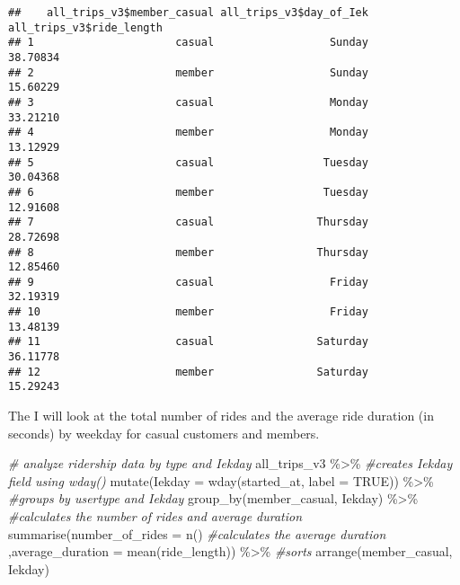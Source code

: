 \documentclass[
]{article}
\newenvironment{Shaded}{\begin{snugshade}}{\end{snugshade}}
\newcommand{\AttributeTok}[1]{\textcolor[rgb]{0.77,0.63,0.00}{#1}}
\newcommand{\CommentTok}[1]{\textcolor[rgb]{0.56,0.35,0.01}{\textit{#1}}}
\newcommand{\ConstantTok}[1]{\textcolor[rgb]{0.00,0.00,0.00}{#1}}
\newcommand{\FunctionTok}[1]{\textcolor[rgb]{0.00,0.00,0.00}{#1}}
\newcommand{\NormalTok}[1]{#1}
\newcommand{\SpecialCharTok}[1]{\textcolor[rgb]{0.00,0.00,0.00}{#1}}
\begin{document}
\begin{Shaded}
\end{Shaded}

\begin{verbatim}
##    all_trips_v3$member_casual all_trips_v3$day_of_Iek all_trips_v3$ride_length
## 1                      casual                  Sunday                 38.70834
## 2                      member                  Sunday                 15.60229
## 3                      casual                  Monday                 33.21210
## 4                      member                  Monday                 13.12929
## 5                      casual                 Tuesday                 30.04368
## 6                      member                 Tuesday                 12.91608
## 7                      casual                Thursday                 28.72698
## 8                      member                Thursday                 12.85460
## 9                      casual                  Friday                 32.19319
## 10                     member                  Friday                 13.48139
## 11                     casual                Saturday                 36.11778
## 12                     member                Saturday                 15.29243
\end{verbatim}

The I will look at the total number of rides and the average ride
duration (in seconds) by weekday for casual customers and members.

\begin{Shaded}
\begin{Highlighting}[]
\CommentTok{\# analyze ridership data by type and Iekday}
\NormalTok{all\_trips\_v3 }\SpecialCharTok{\%\textgreater{}\%} 
\CommentTok{\#creates Iekday field using wday()}
  \FunctionTok{mutate}\NormalTok{(}\AttributeTok{Iekday =} \FunctionTok{wday}\NormalTok{(started\_at, }\AttributeTok{label =} \ConstantTok{TRUE}\NormalTok{)) }\SpecialCharTok{\%\textgreater{}\%}
\CommentTok{\#groups by usertype and Iekday}
  \FunctionTok{group\_by}\NormalTok{(member\_casual, Iekday) }\SpecialCharTok{\%\textgreater{}\%} 
\CommentTok{\#calculates the number of rides and average duration }
  \FunctionTok{summarise}\NormalTok{(}\AttributeTok{number\_of\_rides =} \FunctionTok{n}\NormalTok{()   }
\CommentTok{\#calculates the average duration}
\NormalTok{  ,}\AttributeTok{average\_duration =} \FunctionTok{mean}\NormalTok{(ride\_length)) }\SpecialCharTok{\%\textgreater{}\%} 
\CommentTok{\#sorts}
  \FunctionTok{arrange}\NormalTok{(member\_casual, Iekday)}
\end{Highlighting}
\end{Shaded}
\end{document}
